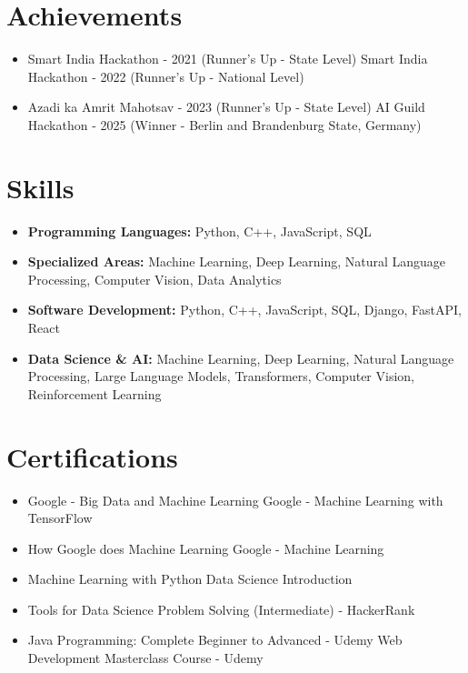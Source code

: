 \documentclass[a4paper,10pt]{article}
\begin{document}
\section*{Achievements}
\begin{itemize}
\item Smart India Hackathon - 2021 (Runner's Up - State Level) \hfill Smart India Hackathon - 2022 (Runner's Up - National Level)
\item Azadi ka Amrit Mahotsav - 2023 (Runner's Up - State Level) \hfill AI Guild Hackathon - 2025 (Winner - Berlin and Brandenburg State, Germany)
\end{itemize}

\section*{Skills}
\begin{itemize}
  \item \textbf{Programming Languages:} Python, C++, JavaScript, SQL
  \item \textbf{Specialized Areas:} Machine Learning, Deep Learning, Natural Language Processing, Computer Vision, Data Analytics
  \item \textbf{Software Development:} Python, C++, JavaScript, SQL, Django, FastAPI, React
  \item \textbf{Data Science \& AI:} Machine Learning, Deep Learning, Natural Language Processing, Large Language Models, Transformers, Computer Vision, Reinforcement Learning
\end{itemize}

\section*{Certifications}
\begin{itemize}
\item Google - Big Data and Machine Learning \hfill Google - Machine Learning with TensorFlow
\item How Google does Machine Learning \hfill Google - Machine Learning
\item Machine Learning with Python \hfill Data Science Introduction
\item Tools for Data Science \hfill Problem Solving (Intermediate) - HackerRank
\item Java Programming: Complete Beginner to Advanced - Udemy \hfill Web Development Masterclass Course - Udemy
\end{itemize}
\end{document}
